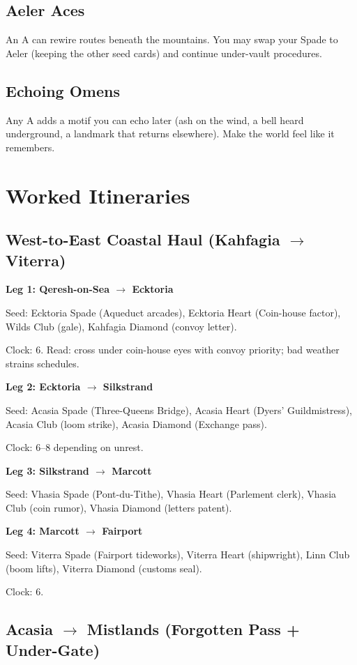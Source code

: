 \subsection{Aeler Aces}
An A can rewire routes beneath the mountains. You may swap your Spade to Aeler (keeping the other seed cards) and continue under-vault procedures.

\subsection{Echoing Omens}
Any A adds a motif you can echo later (ash on the wind, a bell heard underground, a landmark that returns elsewhere). Make the world feel like it remembers.

\section{Worked Itineraries}

\subsection{West-to-East Coastal Haul (Kahfagia $\rightarrow$ Viterra)}

\textbf{Leg 1: Qeresh-on-Sea $\rightarrow$ Ecktoria}

Seed: Ecktoria Spade (Aqueduct arcades), Ecktoria Heart (Coin-house factor), Wilds Club (gale), Kahfagia Diamond (convoy letter).

Clock: 6. Read: cross under coin-house eyes with convoy priority; bad weather strains schedules.

\textbf{Leg 2: Ecktoria $\rightarrow$ Silkstrand}

Seed: Acasia Spade (Three-Queens Bridge), Acasia Heart (Dyers' Guildmistress), Acasia Club (loom strike), Acasia Diamond (Exchange pass).

Clock: 6--8 depending on unrest.

\textbf{Leg 3: Silkstrand $\rightarrow$ Marcott}

Seed: Vhasia Spade (Pont-du-Tithe), Vhasia Heart (Parlement clerk), Vhasia Club (coin rumor), Vhasia Diamond (letters patent).

\textbf{Leg 4: Marcott $\rightarrow$ Fairport}

Seed: Viterra Spade (Fairport tideworks), Viterra Heart (shipwright), Linn Club (boom lifts), Viterra Diamond (customs seal).

Clock: 6.

\subsection{Acasia $\rightarrow$ Mistlands (Forgotten Pass + Under-Gate)}

